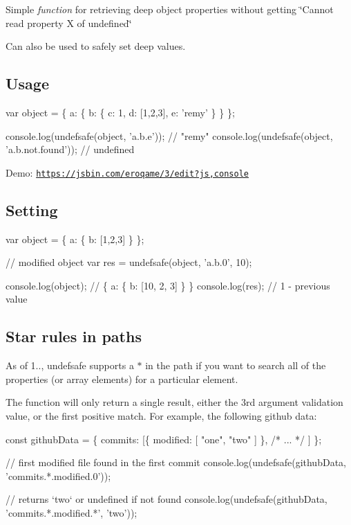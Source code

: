 Simple {\itshape function} for retrieving deep object properties without getting \char`\"{}\+Cannot read property \textquotesingle{}\+X\textquotesingle{} of undefined\char`\"{}

Can also be used to safely set deep values.

\subsection*{Usage}


\begin{DoxyCode}
var object = \{
  a: \{
    b: \{
      c: 1,
      d: [1,2,3],
      e: 'remy'
    \}
  \}
\};

console.log(undefsafe(object, 'a.b.e')); // "remy"
console.log(undefsafe(object, 'a.b.not.found')); // undefined
\end{DoxyCode}


Demo\+: \href{https://jsbin.com/eroqame/3/edit?js,console}{\tt https\+://jsbin.\+com/eroqame/3/edit?js,console}

\subsection*{Setting}


\begin{DoxyCode}
var object = \{
  a: \{
    b: [1,2,3]
  \}
\};

// modified object
var res = undefsafe(object, 'a.b.0', 10);

console.log(object); // \{ a: \{ b: [10, 2, 3] \} \}
console.log(res); // 1 - previous value
\end{DoxyCode}


\subsection*{Star rules in paths}

As of 1.., {\ttfamily undefsafe} supports a {\ttfamily $\ast$} in the path if you want to search all of the properties (or array elements) for a particular element.

The function will only return a single result, either the 3rd argument validation value, or the first positive match. For example, the following github data\+:


\begin{DoxyCode}
const githubData = \{
        commits: [\{
          modified: [
            "one",
            "two"
          ]
        \}, /* ... */ ]
      \};

// first modified file found in the first commit
console.log(undefsafe(githubData, 'commits.*.modified.0'));

// returns `two` or undefined if not found
console.log(undefsafe(githubData, 'commits.*.modified.*', 'two'));
\end{DoxyCode}
 